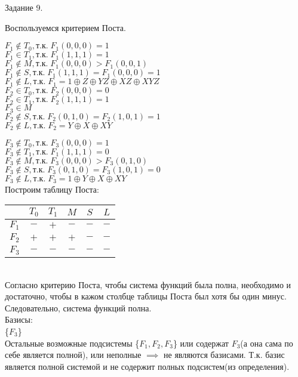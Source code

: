 \documentclass[a4paper,12pt]{report} %
\begin{document}
\bigskip

\begin{center}
	Задание 9.\\
\end{center}

\begin{flushleft}
	Воспользуемся критерием Поста.
	\begin{multicols}{2}
		$F_1\notin{T_0}, \text{т.к.}\; F_1(0,0,0)=1 $ \\
		$F_1 \in{T_1},\text{т.к.}\; F_1(1,1,1)=1 $ \\
		$F_1 \notin{M}, \text{т.к.}\; F_1(0,0,0)>F_1(0,0,1) $ \\
		$F_1 \notin{S}, \text{т.к.}\; F_1(1,1,1)=F_1(0,0,0) = 1 $ \\
		$F_1 \notin{L}, \text{т.к.}\; F_1=1 \oplus Z \oplus YZ \oplus XZ \oplus XYZ$ \\
		\bigskip
		$F_2 \in{T_0}, \text{т.к.}\; F_2(0,0,0)=0 $ \\
		$F_2 \in{T_1},\text{т.к.}\; F_2(1,1,1)=1 $ \\
		$F_3 \in{M}$\\
		$F_2 \notin{S}, \text{т.к.}\; F_2(0,1,0)=F_2(1,0,1) = 1 $ \\
		$F_2 \notin{L}, \text{т.к.}\; F_2=Y \oplus X \oplus XY $ \\
	\end{multicols}
	\bigskip
	$F_3 \notin{T_0}, \text{т.к.}\; F_3(0,0,0)=1 $ \\
	$F_3 \notin{T_1},\text{т.к.}\; F_1(1,1,1)=0 $ \\
	$F_3 \notin{M}, \text{т.к.}\; F_3(0,0,0)>F_3(0,1,0) $ \\
	$F_3 \notin{S}, \text{т.к.}\; F_3(0,1,0)=F_3(1,0,1) = 0 $ \\
	$F_3 \notin{L}, \text{т.к.}\; F_3=1 \oplus Y \oplus X \oplus XY$ \\
	
	Построим таблицу Поста:\\
	\bigskip
	\begin{tabular}{| c | c | c | c | c | c |}
		\hline
		       & $T_0$ & $T_1$ & $M$ & $S$ & $L$ \\
		\hline
		$F_1 $ & $-$   & $+$   & $-$      & $-$   & $-$   \\
		\hline
		$F_2$  & $+$   & $+$   & $+$      & $-$   & $-$   \\
		\hline
		$F_3$  & $-$   & $-$   & $-$      & $-$   & $-$   \\
		\hline
	\end{tabular}\\
	\bigskip
	Согласно критерию Поста, чтобы система функций была полна, необходимо и достаточно, чтобы в кажом столбце таблицы Поста был хотя бы один минус.\\
	Следовательно, система функций полна.\\
	
	Базисы:\\
	\{$F_3$\}\\
	Остальные возможные подсистемы \{$F_1, F_2, F_3$\} или содержат $F_3$(а она сама по себе является полной), или неполные $\implies$ не являются базисами. Т.к. базис является полной системой и не содержит полных подсистем(из определения).
\end{flushleft}
\end{document}
